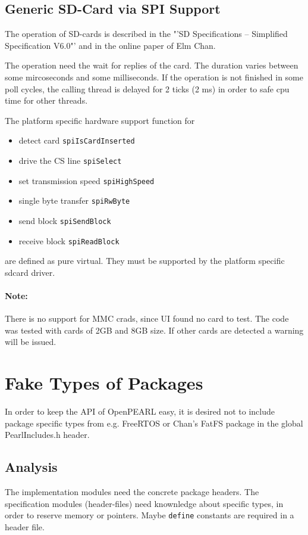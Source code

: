 \subsection{Generic SD-Card via SPI Support}
\label{sec:SDCardSpi}
The operation of SD-cards is described in the "'SD Specifications -- 
Simplified Specification V6.0"' and in the online paper of
Elm Chan.

The operation need the wait for replies of the card. The duration
varies between some mircoseconds and some milliseconds. If the 
operation is not finished in some poll cycles, the calling thread 
is delayed for 2 ticks (2 ms) in order to safe cpu time for other threads.

The platform specific hardware support function for
\begin{itemize}
\item detect card \verb|spiIsCardInserted|
\item drive the CS line \verb|spiSelect|
\item set transmission speed \verb|spiHighSpeed|
\item single byte transfer \verb|spiRwByte|
\item send block \verb|spiSendBlock|
\item receive block \verb|spiReadBlock|
\end{itemize}
are defined as pure virtual. They must be supported by the platform specific 
sdcard driver.


\paragraph{Note:} There is no support for MMC crads, since UI found no card
to test. The code was tested with cards of 2GB and 8GB size.
If other cards are detected a warning will be issued.

\section{Fake Types of Packages}
In order to keep the API of OpenPEARL easy, it is desired not to include
package specific types from e.g. FreeRTOS or Chan's FatFS package 
in the global PearlIncludes.h header.

\subsection{Analysis}
The implementation modules need the concrete package headers.
The specification modules (header-files) need knownledge about 
specific types, in order to reserve memory or pointers. 
Maybe \verb|define| constants are required in a header file.

